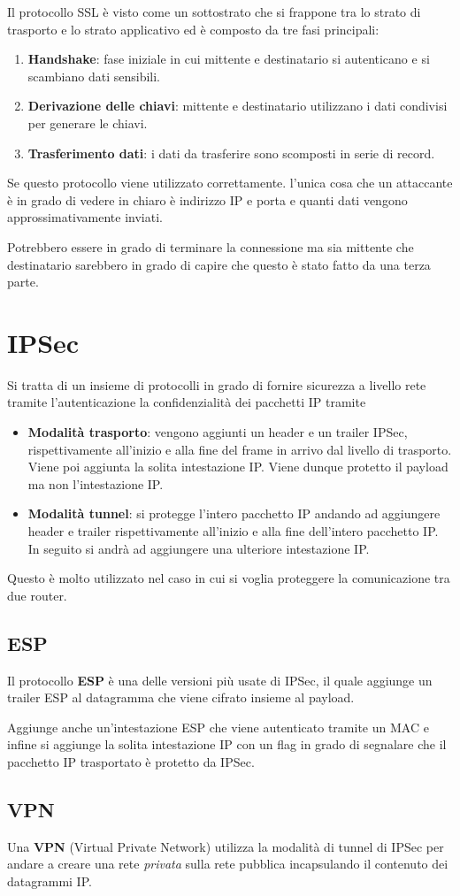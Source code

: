 Il protocollo SSL è visto come un sottostrato che si frappone tra lo
strato di trasporto e lo strato applicativo ed è composto da tre fasi
principali:
\begin{enumerate}
	\item \textbf{Handshake}: fase iniziale in cui mittente e 
		destinatario si autenticano e si scambiano dati sensibili.
	\item \textbf{Derivazione delle chiavi}: mittente e destinatario
		utilizzano i dati condivisi per generare le chiavi.
	\item \textbf{Trasferimento dati}: i dati da trasferire sono 
		scomposti in serie di record.
\end{enumerate}
Se questo protocollo viene utilizzato correttamente. l'unica cosa che
un attaccante è in grado di vedere in chiaro è indirizzo IP e porta e
quanti dati vengono approssimativamente inviati.

Potrebbero essere in grado di terminare la connessione ma sia mittente
che destinatario sarebbero in grado di capire che questo è stato fatto
da una terza parte.

\section{IPSec}
Si tratta di un insieme di protocolli in grado di fornire sicurezza a 
livello rete tramite l'autenticazione la confidenzialità dei pacchetti
IP tramite
\begin{itemize}
	\item \textbf{Modalità trasporto}: vengono aggiunti un header e un
		trailer IPSec, rispettivamente all'inizio e alla fine del frame
		in arrivo dal livello di trasporto. Viene poi aggiunta la 
		solita intestazione IP. Viene dunque protetto il payload ma non
		l'intestazione IP.
	\item \textbf{Modalità tunnel}: si protegge l'intero pacchetto IP
		andando ad aggiungere header e trailer rispettivamente 
		all'inizio e alla fine dell'intero pacchetto IP. In seguito
		si andrà ad aggiungere una ulteriore intestazione IP.
\end{itemize}
Questo è molto utilizzato nel caso in cui si voglia proteggere la 
comunicazione tra due router.

\subsection{ESP}
Il protocollo \textbf{ESP} è una delle versioni più usate di IPSec, il
quale aggiunge un trailer ESP al datagramma che viene cifrato insieme
al payload.

Aggiunge anche un'intestazione ESP che viene autenticato tramite un 
MAC e infine si aggiunge la solita intestazione IP con un flag in 
grado di segnalare che il pacchetto IP trasportato è protetto da IPSec.

\subsection{VPN}
Una \textbf{VPN} (Virtual Private Network) utilizza la modalità di 
tunnel di IPSec per andare a creare una rete \emph{privata} sulla rete
pubblica incapsulando il contenuto dei datagrammi IP.
